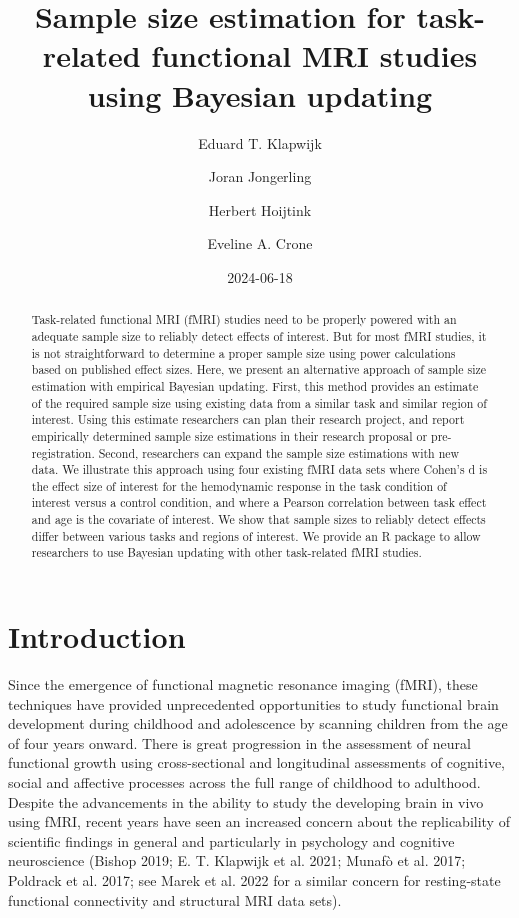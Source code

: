 \documentclass[
  letterpaper,
  DIV=11,
  numbers=noendperiod]{scrartcl}
\title{Sample size estimation for task-related functional MRI studies
using Bayesian updating}
\author{Eduard T. Klapwijk \and Joran Jongerling \and Herbert
Hoijtink \and Eveline A. Crone}
\date{2024-06-18}
\begin{document}
\maketitle
\begin{abstract}
Task-related functional MRI (fMRI) studies need to be properly powered
with an adequate sample size to reliably detect effects of interest. But
for most fMRI studies, it is not straightforward to determine a proper
sample size using power calculations based on published effect sizes.
Here, we present an alternative approach of sample size estimation with
empirical Bayesian updating. First, this method provides an estimate of
the required sample size using existing data from a similar task and
similar region of interest. Using this estimate researchers can plan
their research project, and report empirically determined sample size
estimations in their research proposal or pre-registration. Second,
researchers can expand the sample size estimations with new data. We
illustrate this approach using four existing fMRI data sets where
Cohen's d is the effect size of interest for the hemodynamic response in
the task condition of interest versus a control condition, and where a
Pearson correlation between task effect and age is the covariate of
interest. We show that sample sizes to reliably detect effects differ
between various tasks and regions of interest. We provide an R package
to allow researchers to use Bayesian updating with other task-related
fMRI studies.
\end{abstract}

\section{Introduction}\label{introduction}

Since the emergence of functional magnetic resonance imaging (fMRI),
these techniques have provided unprecedented opportunities to study
functional brain development during childhood and adolescence by
scanning children from the age of four years onward. There is great
progression in the assessment of neural functional growth using
cross-sectional and longitudinal assessments of cognitive, social and
affective processes across the full range of childhood to adulthood.
Despite the advancements in the ability to study the developing brain in
vivo using fMRI, recent years have seen an increased concern about the
replicability of scientific findings in general and particularly in
psychology and cognitive neuroscience (Bishop 2019; E. T. Klapwijk et
al. 2021; Munafò et al. 2017; Poldrack et al. 2017; see Marek et al.
2022 for a similar concern for resting-state functional connectivity and
structural MRI data sets).
\end{document}
